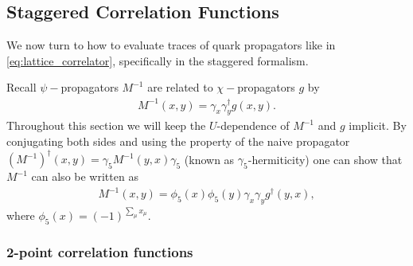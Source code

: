 \subsection{Staggered Correlation Functions}
\label{sec:staggeredcorrelators}

We now turn to how to evaluate traces of quark propagators like in \eqref{eq:lattice_correlator}, specifically in the staggered formalism. %

Recall $\psi-$propagators $M^{-1}$ are related to $\chi-$propagators $g$ by
\begin{align}
  M^{-1}(x,y) = \gamma_x\gamma^{\dagger}_y g(x,y).
\end{align}
Throughout this section we will keep the $U$-dependence of $M^{-1}$ and $g$ implicit. By conjugating both sides and using the property of the naive propagator $(M^{-1})^{\dagger}(x,y) = \gamma_5 M^{-1}(y,x)\gamma_5$ (known as $\gamma_5$-hermiticity) one can show that $M^{-1}$ can also be written as
\begin{align}
  \label{eq:Gconj}
  M^{-1}(x,y) = \phi_5(x)\phi_5(y) \gamma_x\gamma_y g^{\dagger}(y,x),
\end{align}
where $\phi_5(x) = (-1)^{\sum_{\mu} x_{\mu}}$.

\subsubsection{2-point correlation functions}

